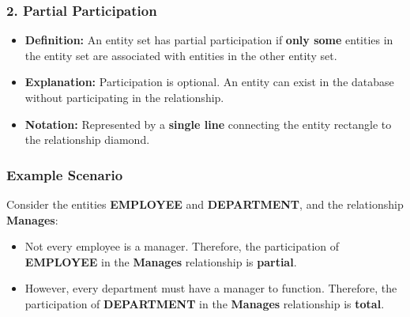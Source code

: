 \documentclass[12pt,a3paper]{article}
\begin{document}
\begin{enumerate}
\begin{tcolorbox}[enhanced,breakable,ansbox,colback=cA!4,colframe=cA,boxrule=0.8pt,arc=5pt,title={\textbf{Answer}},fonttitle=\bfseries\color{white},colbacktitle=cA]
\subsubsection*{2. Partial Participation}
\begin{itemize}
    \item \textbf{Definition:} An entity set has partial participation if \textbf{only some} entities in the entity set are associated with entities in the other entity set.
    \item \textbf{Explanation:} Participation is optional. An entity can exist in the database without participating in the relationship.
    \item \textbf{Notation:} Represented by a \textbf{single line} connecting the entity rectangle to the relationship diamond.
\end{itemize}

\vspace{1em}
\subsubsection*{Example Scenario}

Consider the entities \textbf{EMPLOYEE} and \textbf{DEPARTMENT}, and the relationship \textbf{Manages}:
\begin{itemize}
    \item Not every employee is a manager. Therefore, the participation of \textbf{EMPLOYEE} in the \textbf{Manages} relationship is \textbf{partial}.
    \item However, every department must have a manager to function. Therefore, the participation of \textbf{DEPARTMENT} in the \textbf{Manages} relationship is \textbf{total}.
\end{itemize}

\vspace{1em}
\begin{center}
\end{center}
\end{tcolorbox}
\end{enumerate}
\end{document}
